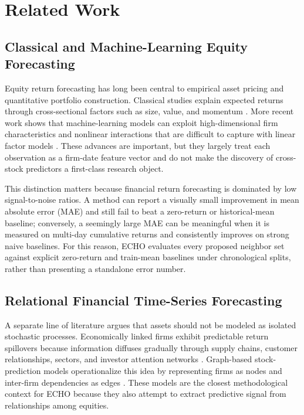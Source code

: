 \documentclass[12pt,a4paper,titlepage]{article}
\begin{document}
\section{Related Work}

\subsection{Classical and Machine-Learning Equity Forecasting}

Equity return forecasting has long been central to empirical asset pricing and quantitative portfolio construction. Classical studies explain expected returns through cross-sectional factors such as size, value, and momentum \citep{fama1993common,jegadeesh1993returns}. More recent work shows that machine-learning models can exploit high-dimensional firm characteristics and nonlinear interactions that are difficult to capture with linear factor models \citep{gu2020empirical,chen2023deep}. These advances are important, but they largely treat each observation as a firm-date feature vector and do not make the discovery of cross-stock predictors a first-class research object.

This distinction matters because financial return forecasting is dominated by low signal-to-noise ratios. A method can report a visually small improvement in mean absolute error (MAE) and still fail to beat a zero-return or historical-mean baseline; conversely, a seemingly large MAE can be meaningful when it is measured on multi-day cumulative returns and consistently improves on strong naive baselines. For this reason, ECHO evaluates every proposed neighbor set against explicit zero-return and train-mean baselines under chronological splits, rather than presenting a standalone error number.

\subsection{Relational Financial Time-Series Forecasting}

A separate line of literature argues that assets should not be modeled as isolated stochastic processes. Economically linked firms exhibit predictable return spillovers because information diffuses gradually through supply chains, customer relationships, sectors, and investor attention networks \citep{cohen2008supply,menzly2010market}. Graph-based stock-prediction models operationalize this idea by representing firms as nodes and inter-firm dependencies as edges \citep{matsunaga2019graph,li2020modeling}. These models are the closest methodological context for ECHO because they also attempt to extract predictive signal from relationships among equities.
\end{document}
